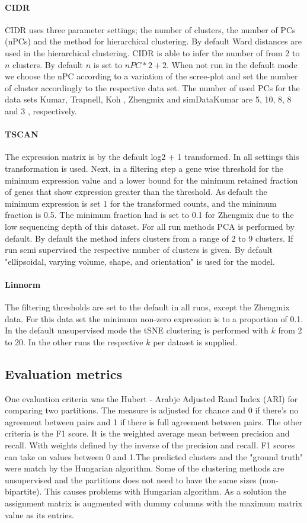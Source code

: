 \documentclass[11pt, a4paper]{article}\usepackage[]{graphicx}\usepackage[]{color}
\begin{document}
\paragraph{CIDR}
CIDR uses three parameter settings; the number of clusters, the number of PCs (nPCs) and the method for hierarchical clustering. By default Ward distances are used in the hierarchical clustering. CIDR is able to infer the number of from 2 to $n$ clusters. By default $n$ is set to $nPC*2+2$. When not run in the default mode we choose the nPC according to a variation of the scree-plot and set the number of cluster accordingly to the respective data set. The number of used PCs for the data sets Kumar, Trapnell, Koh , Zhengmix and simDataKumar are  5, 10, 8, 8 and 3 , respectively.
\paragraph{TSCAN}
The expression matrix is by the default log2 + 1 transformed. In all settings this transformation is used. 
Next, in a filtering step a gene wise threshold for the minimum expression value and a lower bound for the minimum retained fraction of genes that show expression greater than the threshold. As default the minimum expression is set 1 for the transformed counts,  and the minimum fraction is 0.5. The minimum fraction had is set to 0.1 for Zhengmix due to the low sequencing depth of this dataset. For all run methods PCA is performed by default. By default the method infers clusters from a range of 2 to 9 clusters. If run semi supervised the respective number of clusters is given. By default "ellipsoidal, varying volume, shape, and orientation" is used for the model.
\paragraph{Linnorm}
The filtering thresholds are set to the default in all runs, except the Zhengmix data.  For this data set the minimum non-zero expression is to a proportion of 0.1. In the default unsupervised mode the tSNE clustering is performed with $k$ from 2 to 20. In the other runs the respective $k$ per dataset is supplied.
\subsection{Evaluation metrics}
One evaluation criteria was the Hubert - Arabje Adjusted Rand Index (ARI) for comparing two partitions. The measure is adjusted for chance and 0 if there's no agreement between pairs and 1 if there is full agreement between pairs. The other criteria is the F1 score. It is the weighted average mean between precision and recall. With weights defined by the inverse of the precision and recall. F1 scores can take on values between 0 and 1.The predicted clusters and the "ground truth" were match by the Hungarian algorithm. Some of the clustering methods are unsupervised and the partitions does not need to have the same sizes (non-bipartite). This causes problems with Hungarian algorithm. As a solution the assignment matrix is augmented with dummy columns with the maximum matrix value as its entries.
\end{document}
